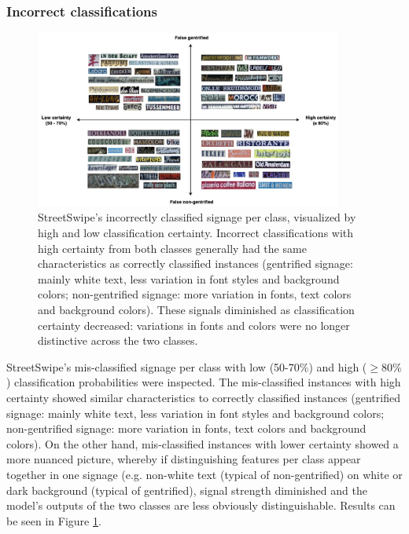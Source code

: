\subsubsection{Incorrect classifications} 

\begin{figure}[h!]
    \centering
    \includegraphics[width=0.9\textwidth]{media/results/output_vis-SS_incorrect.jpg}
    \caption{StreetSwipe's incorrectly classified signage per class, visualized by high and low classification certainty. Incorrect classifications with high certainty from both classes generally had the same characteristics as correctly classified instances (gentrified signage: mainly white text, less variation in font styles and background colors; non-gentrified signage: more variation in fonts, text colors and background colors). These signals diminished as classification certainty decreased: variations in fonts and colors were no longer distinctive across the two classes.}
    \label{fig:output_vis_SS_incorrect}
\end{figure}

StreetSwipe's mis-classified signage per class with low (50-70\%) and high ($ \geq 80\% $) classification probabilities were inspected. The mis-classified instances with high certainty showed similar characteristics to correctly classified instances (gentrified signage: mainly white text, less variation in font styles and background colors; non-gentrified signage: more variation in fonts, text colors and background colors). On the other hand, mis-classified instances with lower certainty showed a more nuanced picture, whereby if distinguishing features per class appear together in one signage (e.g. non-white text (typical of non-gentrified) on white or dark background (typical of gentrified), signal strength diminished and the model's outputs of the two classes are less obviously distinguishable. Results can be seen in Figure \ref{fig:output_vis_SS_incorrect}.




